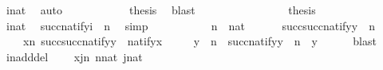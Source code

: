 \begin{isabellebody}
\ {\isacartoucheopen}i{\isasymin}nat{\isacartoucheclose}\ \isamarkupfalse%
\ auto\isanewline
\ \ \ \ \ \ \ \ \isamarkupfalse%
\ \isamarkupfalse%
\ {\isacharquery}{\kern0pt}thesis\ \isamarkupfalse%
\ blast\isanewline
\ \ \ \ \ \ \isamarkupfalse%
\isanewline
\ \ \ \ \ \ \isamarkupfalse%
\ \isamarkupfalse%
\ {\isacharquery}{\kern0pt}thesis\ \isacommand{{\isachardot}{\kern0pt}}\isamarkupfalse%
\isanewline
\ \ \ \ \isamarkupfalse%
\isanewline
\ \ \ \ \isamarkupfalse%
\ {\isacartoucheopen}i{\isasymin}nat{\isacartoucheclose}\ \isamarkupfalse%
\ {\isachardoublequoteopen}succ{\isacharparenleft}{\kern0pt}natify{\isacharparenleft}{\kern0pt}i{\isacharparenright}{\kern0pt}{\isacharparenright}{\kern0pt}\ {\isacharequal}{\kern0pt}\ n{\isachardoublequoteclose}\ \isamarkupfalse%
\ simp\isanewline
\ \ \isacommand{{\isacharbraceright}{\kern0pt}}\isamarkupfalse%
\isanewline
\ \ \isamarkupfalse%
\ \isanewline
\ \ \isamarkupfalse%
\ {\isachardoublequoteopen}n\ {\isasymin}\ nat\ {\isasymLongrightarrow}\ \isanewline
\ \ \ \ succ{\isacharparenleft}{\kern0pt}succ{\isacharparenleft}{\kern0pt}natify{\isacharparenleft}{\kern0pt}y{\isacharparenright}{\kern0pt}{\isacharparenright}{\kern0pt}{\isacharparenright}{\kern0pt}\ {\isasymnoteq}\ n\ {\isasymLongrightarrow}\ \isanewline
\ \ \ \ {\isasymforall}x{\isasymin}n{\isachardot}{\kern0pt}\ succ{\isacharparenleft}{\kern0pt}succ{\isacharparenleft}{\kern0pt}natify{\isacharparenleft}{\kern0pt}y{\isacharparenright}{\kern0pt}{\isacharparenright}{\kern0pt}{\isacharparenright}{\kern0pt}\ {\isasymnoteq}\ natify{\isacharparenleft}{\kern0pt}x{\isacharparenright}{\kern0pt}\ {\isasymLongrightarrow}\isanewline
\ \ \ \ y\ {\isasymin}\ n\ {\isasymLongrightarrow}\ succ{\isacharparenleft}{\kern0pt}natify{\isacharparenleft}{\kern0pt}y{\isacharparenright}{\kern0pt}{\isacharparenright}{\kern0pt}\ {\isacharequal}{\kern0pt}\ n{\isachardoublequoteclose}\ \ y\isanewline
\ \ \ \ \isamarkupfalse%
\ blast\isanewline
{}\isamarkupfalse%
%
\endisatagproof
{\isafoldproof}%
%
\isadelimproof
\isanewline
%
\endisadelimproof
\isanewline
{}\isamarkupfalse%
\ in{\isacharunderscore}{\kern0pt}add{\isacharunderscore}{\kern0pt}del\ {\isacharcolon}{\kern0pt}\isanewline
\ \ \ {\isachardoublequoteopen}x{\isasymin}j{\isacharhash}{\kern0pt}{\isacharplus}{\kern0pt}n{\isachardoublequoteclose}\ {\isachardoublequoteopen}n{\isasymin}nat{\isachardoublequoteclose}\ {\isachardoublequoteopen}j{\isasymin}nat{\isachardoublequoteclose}\isanewline

\end{isabellebody}
